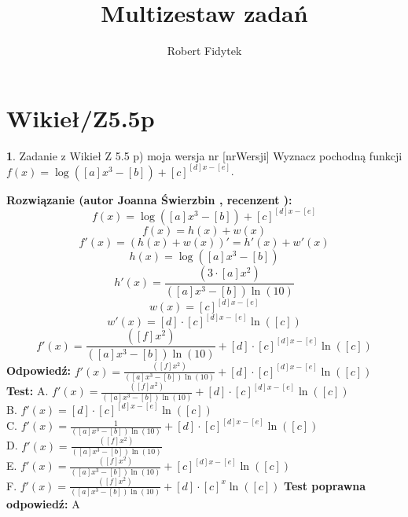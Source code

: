 \documentclass[12pt, a4paper]{article}
\title{Multizestaw zadań}
\author{Robert Fidytek}
\date{}
\theoremstyle{definition} %
\newtheorem{zad}{}
\newcommand{\kategoria}[1]{\section{#1}} %
\newcommand{\zadStart}[1]{\begin{zad}#1\newline} %
\newcommand{\zadStop}{\end{zad}}   %
\newcommand{\rozwStart}[2]{\noindent \textbf{Rozwiązanie (autor #1 , recenzent #2): }\newline} %
\newcommand{\rozwStop}{\newline}                                            %
\newcommand{\odpStart}{\noindent \textbf{Odpowiedź:}\newline}    %
\newcommand{\odpStop}{\newline}                                             %
\newcommand{\testStart}{\noindent \textbf{Test:}\newline} %
\newcommand{\testStop}{\newline} %
\newcommand{\kluczStart}{\noindent \textbf{Test poprawna odpowiedź:}\newline} %
\newcommand{\kluczStop}{\newline} %
\begin{document}
\maketitle


\kategoria{Wikieł/Z5.5p}
\zadStart{Zadanie z Wikieł Z 5.5 p) moja wersja nr [nrWersji]}
Wyznacz pochodną funkcji \\ $f(x)=\log\left([a]x^3-[b]\right) +[c]^{[d]x-[e]} $.
\zadStop
\rozwStart{Joanna Świerzbin}{}
$$f(x)=\log\left([a]x^3-[b]\right) +[c]^{[d]x-[e]} $$
$$f(x)=h(x)+w(x)$$
$$f'(x)=(h(x)+w(x))'=h'(x)+w'(x)$$
$$h(x)=\log\left([a]x^3-[b]\right)$$
$$h'(x)=\frac{\left(3\cdot[a]x^2\right)}{\left([a]x^3-[b]\right)\ln{(10)}}$$
$$w(x)=[c]^{[d]x-[e]}$$
$$w'(x)=[d]\cdot[c]^{[d]x-[e]} \ln{([c])}$$
$$f'(x)= \frac{\left([f]x^2\right)}{\left([a]x^3-[b]\right)\ln{(10)}} + [d]\cdot[c]^{[d]x-[e]} \ln{([c])} $$
\rozwStop
\odpStart
$f'(x)= \frac{\left([f]x^2\right)}{\left([a]x^3-[b]\right)\ln{(10)}} + [d]\cdot[c]^{[d]x-[e]} \ln{([c])} $
\odpStop
\testStart
A. $f'(x)= \frac{\left([f]x^2\right)}{\left([a]x^3-[b]\right)\ln{(10)}} + [d]\cdot[c]^{[d]x-[e]} \ln{([c])} $\\
B. $f'(x)= [d]\cdot[c]^{[d]x-[e]} \ln{([c])} $\\
C. $f'(x)= \frac{1}{\left([a]x^3-[b]\right)\ln{(10)}} + [d]\cdot[c]^{[d]x-[e]} \ln{([c])} $\\
D. $f'(x)= \frac{\left([f]x^2\right)}{\left([a]x^3-[b]\right)\ln{(10)}} $\\
E. $f'(x)= \frac{\left([f]x^2\right)}{\left([a]x^3-[b]\right)\ln{(10)}} + [c]^{[d]x-[e]} \ln{([c])} $\\
F. $f'(x)= \frac{\left([f]x^2\right)}{\left([a]x^3-[b]\right)\ln{(10)}} + [d]\cdot[c]^{x} \ln{([c])} $
\testStop
\kluczStart
A
\kluczStop
\end{document}
